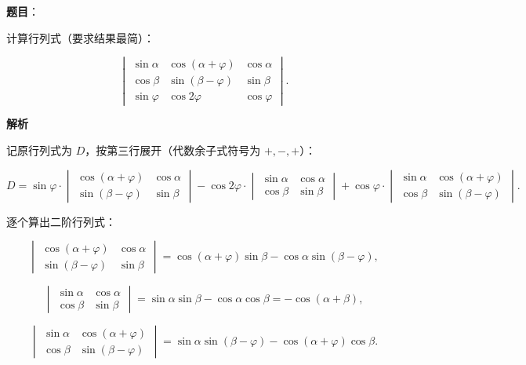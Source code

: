 \begin{answer}

\textbf{题目}：

计算行列式（要求结果最简）：

\nopagebreak[4]
\[
\begin{vmatrix}
\sin\alpha & \cos(\alpha+\varphi) & \cos\alpha\\
\cos\beta & \sin(\beta-\varphi) & \sin\beta\\
\sin\varphi & \cos 2\varphi & \cos\varphi
\end{vmatrix}.
\]

\textbf{解析}

记原行列式为 $D$，按第三行展开（代数余子式符号为 $+,-,+$）：

\nopagebreak[4]
\[
D=\sin\varphi\cdot
\begin{vmatrix}
\cos(\alpha+\varphi) & \cos\alpha\\
\sin(\beta-\varphi) & \sin\beta
\end{vmatrix}
-\cos 2\varphi\cdot
\begin{vmatrix}
\sin\alpha & \cos\alpha\\
\cos\beta & \sin\beta
\end{vmatrix}
+\cos\varphi\cdot
\begin{vmatrix}
\sin\alpha & \cos(\alpha+\varphi)\\
\cos\beta & \sin(\beta-\varphi)
\end{vmatrix}.
\]

逐个算出二阶行列式：

\nopagebreak[4]
\[
\begin{vmatrix}
\cos(\alpha+\varphi) & \cos\alpha\\
\sin(\beta-\varphi) & \sin\beta
\end{vmatrix}
=\cos(\alpha+\varphi)\sin\beta-\cos\alpha\sin(\beta-\varphi),
\]

\nopagebreak[4]
\[
\begin{vmatrix}
\sin\alpha & \cos\alpha\\
\cos\beta & \sin\beta
\end{vmatrix}
=\sin\alpha\sin\beta-\cos\alpha\cos\beta=-\cos(\alpha+\beta),
\]

\nopagebreak[4]
\[
\begin{vmatrix}
\sin\alpha & \cos(\alpha+\varphi)\\
\cos\beta & \sin(\beta-\varphi)
\end{vmatrix}
=\sin\alpha\sin(\beta-\varphi)-\cos(\alpha+\varphi)\cos\beta.
\]


\end{answer}
